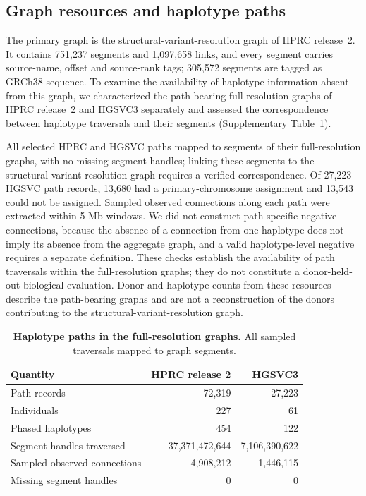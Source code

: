 \documentclass[11pt]{article}
\begin{document}
\begin{bibunit}[unsrtnat]
\setcounter{table}{0}
\setcounter{figure}{0}

\section{Graph resources and haplotype paths}
\label{S-snote:resources}

The primary graph is the structural-variant-resolution graph of HPRC release~2\cite{supp__hprc2023draft}. It contains 751,237 segments and 1,097,658 links, and every segment carries source-name, offset and source-rank tags; 305,572 segments are tagged as GRCh38 sequence. To examine the availability of haplotype information absent from this graph, we characterized the path-bearing full-resolution graphs of HPRC release~2 and HGSVC3\cite{supp__hgsvc32025} separately and assessed the correspondence between haplotype traversals and their segments (Supplementary Table~\ref{S-stab:paths}).

All selected HPRC and HGSVC paths mapped to segments of their full-resolution graphs, with no missing segment handles; linking these segments to the structural-variant-resolution graph requires a verified correspondence. Of 27,223 HGSVC path records, 13,680 had a primary-chromosome assignment and 13,543 could not be assigned. Sampled observed connections along each path were extracted within 5-Mb windows. We did not construct path-specific negative connections, because the absence of a connection from one haplotype does not imply its absence from the aggregate graph, and a valid haplotype-level negative requires a separate definition. These checks establish the availability of path traversals within the full-resolution graphs; they do not constitute a donor-held-out biological evaluation. Donor and haplotype counts from these resources describe the path-bearing graphs and are not a reconstruction of the donors contributing to the structural-variant-resolution graph.

\begin{table}[H]
\centering
\caption{\textbf{Haplotype paths in the full-resolution graphs.} All sampled traversals mapped to graph segments.}
\label{S-stab:paths}
\small
\begin{tabular}{@{}lrr@{}}
\toprule
Quantity & HPRC release 2 & HGSVC3 \\
\midrule
Path records & 72,319 & 27,223 \\
Individuals & 227 & 61 \\
Phased haplotypes & 454 & 122 \\
Segment handles traversed & 37,371,472,644 & 7,106,390,622 \\
Sampled observed connections & 4,908,212 & 1,446,115 \\
Missing segment handles & 0 & 0 \\
\bottomrule
\end{tabular}
\end{table}


\end{bibunit}
\end{document}
